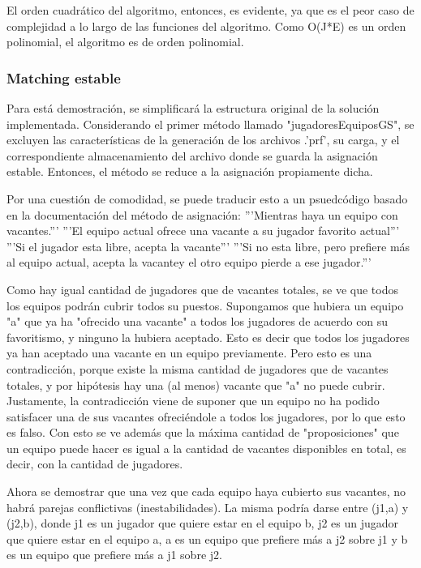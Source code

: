 \documentclass[article,a4paper]{article}
\begin{document}
El orden cuadrático del algoritmo, entonces, es evidente, ya que es el peor caso de complejidad a lo largo de las funciones del algoritmo. Como O(J*E) es un orden polinomial, el algoritmo es de orden polinomial.

\subsubsection{Matching estable}

Para está demostración, se simplificará la estructura original de la solución implementada. Considerando el primer método llamado "jugadoresEquiposGS", se excluyen las características de la generación de los archivos .'prf', su carga, y el correspondiente almacenamiento del archivo donde se guarda la asignación estable. Entonces, el método se reduce a la asignación propiamente dicha.

Por una cuestión de comodidad, se puede traducir esto a un psuedcódigo basado en la documentación del método de asignación:
'''Mientras haya un equipo con vacantes.'''
    '''El equipo actual ofrece una vacante a su jugador favorito actual'''
        '''Si el jugador esta libre, acepta la vacante'''
              '''Si no esta libre, pero prefiere más al equipo actual, acepta la vacantey el otro equipo pierde a ese jugador.'''

Como hay igual cantidad de jugadores que de vacantes totales, se ve que todos los equipos podrán cubrir todos su puestos. Supongamos que hubiera un equipo "a" que ya ha "ofrecido una vacante" a todos los jugadores de acuerdo con su favoritismo, y ninguno la hubiera aceptado. Esto es decir que todos los jugadores ya han aceptado una vacante en un equipo previamente. Pero esto es una contradicción, porque existe la misma cantidad de jugadores que de vacantes totales, y por hipótesis hay una (al menos) vacante que "a" no puede cubrir. Justamente, la contradicción viene de suponer que un equipo no ha podido satisfacer una de sus vacantes ofreciéndole a todos los jugadores, por lo que esto es falso. Con esto se ve además que la máxima cantidad de "proposiciones" que un equipo puede hacer es igual a la cantidad de vacantes disponibles en total, es decir, con la cantidad de jugadores.

Ahora se demostrar que una vez que cada equipo haya cubierto sus vacantes, no habrá parejas conflictivas (inestabilidades). La misma podría darse entre (j1,a) y (j2,b), donde j1 es un jugador que quiere estar en el equipo b, j2 es un jugador que quiere estar en el equipo a, a es un equipo que prefiere más a j2 sobre j1 y b es un equipo que prefiere más a j1 sobre j2.
\end{document}
